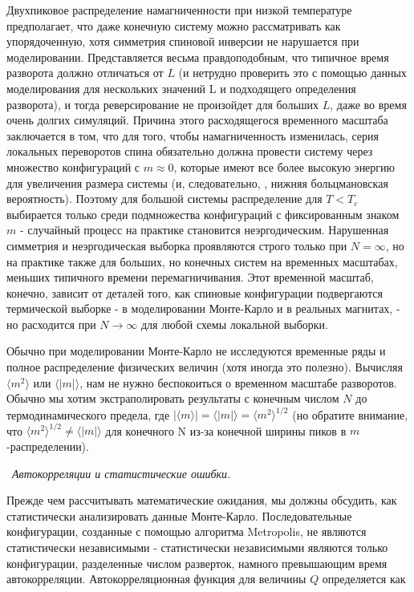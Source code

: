 \documentclass[11pt]{article}
\begin{document}
Двухпиковое распределение намагниченности при низкой температуре предполагает, что даже конечную систему можно рассматривать как упорядоченную, хотя симметрия спиновой инверсии не нарушается при моделировании. Представляется весьма правдоподобным, что типичное время разворота должно отличаться от $L$ (и нетрудно проверить это с помощью данных моделирования для нескольких значений L и подходящего определения разворота), и тогда реверсирование не произойдет для больших $L$, даже во время очень долгих симуляций. Причина этого расходящегося временного масштаба заключается в том, что для того, чтобы намагниченность изменилась, серия локальных переворотов спина обязательно должна провести систему через множество конфигураций с $m \approx 0$, которые имеют все более высокую энергию для увеличения размера системы (и, следовательно, , нижняя больцмановская вероятность). Поэтому для большой системы распределение для $T <T_c$ выбирается только среди подмножества конфигураций с фиксированным знаком $m$ - случайный процесс на практике становится неэргодическим. Нарушенная симметрия и неэргодическая выборка проявляются строго только при $N = ∞$, но на практике также для больших, но конечных систем на временных масштабах, меньших типичного времени перемагничивания. Этот временной масштаб, конечно, зависит от деталей того, как спиновые конфигурации подвергаются термической выборке - в моделировании Монте-Карло и в реальных магнитах, - но расходится при $N → ∞$ для любой схемы локальной выборки.

Обычно при моделировании Монте-Карло не исследуются временные ряды и полное распределение физических величин (хотя иногда это полезно). Вычисляя $\langle m^2 \rangle$ или $\langle |m| \rangle$, нам не нужно беспокоиться о временном масштабе разворотов.
Обычно мы хотим экстраполировать результаты с конечным числом $N$ до термодинамического предела, где $|\langle m \rangle | = \langle |m| \rangle = \langle m^2 \rangle^{1/2}$ (но обратите внимание, что $\langle m^2 \rangle ^{1/2} \ne \langle |m| \rangle$ для конечного N из-за конечной ширины пиков в $m$-распределении).

~\emph{Автокорреляции и статистические ошибки.}

Прежде чем рассчитывать математические ожидания, мы должны обсудить, как статистически анализировать данные Монте-Карло. Последовательные конфигурации, созданные с помощью алгоритма Metropolis, не являются статистически независимыми - статистически независимыми являются только конфигурации, разделенные числом разверток, намного превышающим время автокорреляции. Автокорреляционная функция для величины $Q$ определяется как
\end{document}
